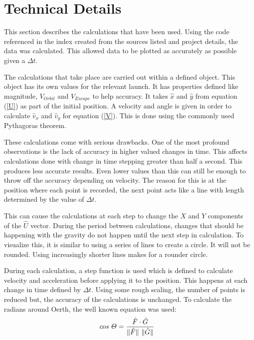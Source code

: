 \documentclass[12pt]{extarticle}
\begin{document}
\section{Technical Details}

This section describes the calculations that have been used. Using the code referenced in the index created from the sources listed and project details, the data was calculated. This allowed data to be plotted as accurately as possible given a $\varDelta t$.

The calculations that take place are carried out within a defined object. This object has its own values for the relevant launch. It has properties defined like magnitude, $V_{Orbit}$ and $V_{Escape}$ to help accuracy. It takes $\hat{x}$ and $\hat{y}$ from equation (\ref{U}) as part of the initial position. A velocity and angle is given in order to calculate $\hat{v}_x$ and $\hat{v}_y$ for equation (\ref{V}). This is done using the commonly used Pythagoras theorem.

These calculations come with serious drawbacks. One of the most profound observations is the lack of accuracy in higher valued changes in time. This affects calculations done with change in time stepping greater than half a second. This produces less accurate results. Even lower values than this can still be enough to throw off the accuracy depending on velocity. The reason for this is at the position where each point is recorded, the next point acts like a line with length determined by the value of $\varDelta t$. 

This can cause the calculations at each step to change the $X$ and $Y$ components of the $\hat{U}$ vector. During the period between calculations, changes that should be happening with the gravity do not happen until the next step in calculation. To visualize this, it is similar to using a series of lines to create a circle. It will not be rounded. Using increasingly shorter lines makes for a rounder circle.

During each calculation, a step function is used which is defined to calculate velocity and acceleration before applying it to the position. This happens at each change in time defined by $\varDelta t$. Using some rough scaling, the number of points is reduced but, the accuracy of the calculations is unchanged.
To calculate the radians around Oerth, the well known equation was used:
\begin{equation}
\notag
cos\ \varTheta = \frac{\hat{F} \cdot \hat{G}}{\|\hat{F}\|\ \|\hat{G}\|}
\end{equation}
\end{document}
